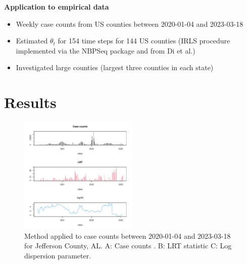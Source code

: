 \documentclass{beamer}
\begin{document}
\begin{frame}{\textbf{Application to empirical data}}
    \begin{itemize}[<+->] %
            \item Weekly case counts from US counties between 2020-01-04 and 2023-03-18
		\item Estimated \begin{math}\theta_t\end{math} for 154 time steps for 144 US counties (IRLS procedure implemented via the NBPSeq package\cite{NBPSeq} and from Di et al.\cite{yanming_nbp_2011}) 
		\item Investigated large counties (largest three counties in each state)
	\end{itemize}
\end{frame}

\section{Results}
\begin{frame}{\textbf{}}
		\begin{figure}[!h]
			\includegraphics[width=0.5\textwidth]{compare}
			\caption{
				Method applied to case counts between 2020-01-04 and 2023-03-18 for Jefferson County, AL. A: Case counts . B: LRT statistic C: Log dispersion parameter.
			}
			\label{fig2}
		\end{figure}
\end{frame}
\end{document}
